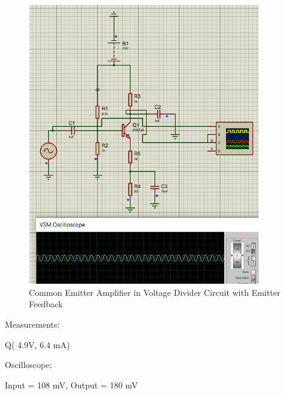 \begin{figure}[H]
    \centering
    \includegraphics[width = 0.9\textwidth]{Imagenes/Imagenes_Santiago/6.PNG}
    \caption{Common Emitter Amplifier in Voltage Divider Circuit with Emitter Feedback}
    \label{circuit2Ssimulated}
\end{figure}

Measurements:
\begin{center}
    Q( 4.9V, 6.4 mA)
\end{center}

Oscilloscope:

\begin{center}
    Input = 108 mV, Output = 180 mV
\end{center}